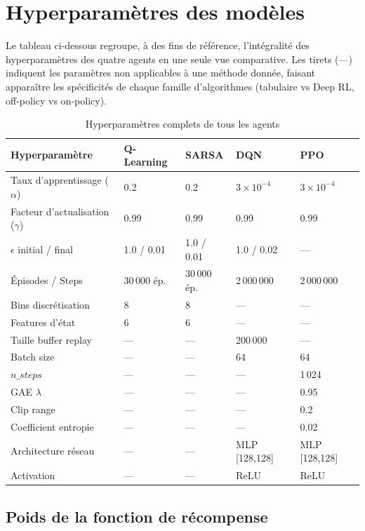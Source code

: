 \documentclass[11pt,a4paper]{report}
\begin{document}
\chapter{Hyperparamètres des modèles}
\label{ann:hyperparametres}

Le tableau ci-dessous regroupe, \`a des fins de r\'ef\'erence, l'int\'egralit\'e des hyperparam\`etres des quatre agents en une seule vue comparative. Les tirets (---) indiquent les param\`etres non applicables \`a une m\'ethode donn\'ee, faisant appara\^itre les sp\'ecificit\'es de chaque famille d'algorithmes (tabulaire vs Deep RL, off-policy vs on-policy).

\begin{table}[H]
\centering
\caption{Hyperparamètres complets de tous les agents}
\begin{tabular}{lllll}
\toprule
\textbf{Hyperparamètre} & \textbf{Q-Learning} & \textbf{SARSA} & \textbf{DQN} & \textbf{PPO} \\
\midrule
Taux d'apprentissage ($\alpha$) & 0.2 & 0.2 & $3\times10^{-4}$ & $3\times10^{-4}$ \\
Facteur d'actualisation ($\gamma$) & 0.99 & 0.99 & 0.99 & 0.99 \\
$\epsilon$ initial / final & 1.0 / 0.01 & 1.0 / 0.01 & 1.0 / 0.02 & — \\
Épisodes / Steps & 30\,000 ép. & 30\,000 ép. & 2\,000\,000 & 2\,000\,000 \\
Bins discrétisation & 8 & 8 & — & — \\
Features d'état & 6 & 6 & — & — \\
Taille buffer replay & — & — & 200\,000 & — \\
Batch size & — & — & 64 & 64 \\
$n\_steps$ & — & — & — & 1\,024 \\
GAE $\lambda$ & — & — & — & 0.95 \\
Clip range & — & — & — & 0.2 \\
Coefficient entropie & — & — & — & 0.02 \\
Architecture réseau & — & — & MLP [128,128] & MLP [128,128] \\
Activation & — & — & ReLU & ReLU \\
\bottomrule
\end{tabular}
\end{table}

\section*{Poids de la fonction de récompense}
\end{document}
